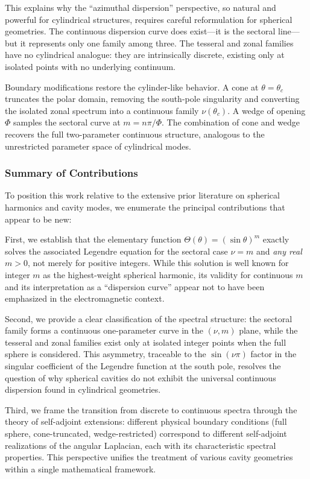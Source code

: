 \documentclass[
  aip,
  amsmath,amssymb,
  preprint
]{revtex4-1}
\begin{document}
This explains why the ``azimuthal dispersion'' perspective, so natural and powerful for cylindrical structures, requires careful reformulation for spherical geometries. The continuous dispersion curve does exist---it is the sectoral line---but it represents only one family among three. The tesseral and zonal families have no cylindrical analogue: they are intrinsically discrete, existing only at isolated points with no underlying continuum.

Boundary modifications restore the cylinder-like behavior. A cone at $\theta = \theta_c$ truncates the polar domain, removing the south-pole singularity and converting the isolated zonal spectrum into a continuous family $\nu(\theta_c)$. A wedge of opening $\Phi$ samples the sectoral curve at $m = n\pi/\Phi$. The combination of cone and wedge recovers the full two-parameter continuous structure, analogous to the unrestricted parameter space of cylindrical modes.

\subsubsection{Summary of Contributions}

To position this work relative to the extensive prior literature on spherical harmonics and cavity modes, we enumerate the principal contributions that appear to be new:

First, we establish that the elementary function $\Theta(\theta) = (\sin\theta)^m$ exactly solves the associated Legendre equation for the sectoral case $\nu = m$ and \textit{any real} $m > 0$, not merely for positive integers. While this solution is well known for integer $m$ as the highest-weight spherical harmonic, its validity for continuous $m$ and its interpretation as a ``dispersion curve'' appear not to have been emphasized in the electromagnetic context.

Second, we provide a clear classification of the spectral structure: the sectoral family forms a continuous one-parameter curve in the $(\nu, m)$ plane, while the tesseral and zonal families exist only at isolated integer points when the full sphere is considered. This asymmetry, traceable to the $\sin(\nu\pi)$ factor in the singular coefficient of the Legendre function at the south pole, resolves the question of why spherical cavities do not exhibit the universal continuous dispersion found in cylindrical geometries.

Third, we frame the transition from discrete to continuous spectra through the theory of self-adjoint extensions: different physical boundary conditions (full sphere, cone-truncated, wedge-restricted) correspond to different self-adjoint realizations of the angular Laplacian, each with its characteristic spectral properties. This perspective unifies the treatment of various cavity geometries within a single mathematical framework.
\end{document}
